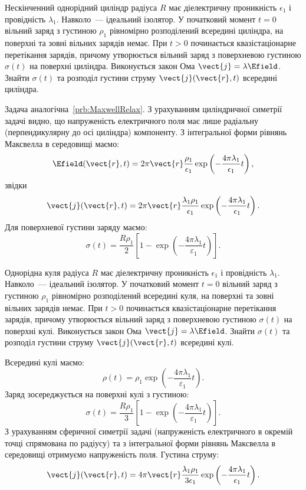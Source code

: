 \begin{problem}
Нескінченний однорідний циліндр радіуса $R$ має діелектричну проникність $\epsilon_1$  і провідність $\lambda_1$. Навколо~--- ідеальний ізолятор. У початковий момент $t = 0$ вільний заряд з густиною $\rho_1$ рівномірно розподілений всередині циліндра, на поверхні та зовні вільних зарядів немає. При $t > 0$  починається квазістаціонарне перетікання зарядів, причому утворюється вільний заряд з поверхневою густиною $\sigma(t)$  на поверхні циліндра. Виконується закон Ома   $\vect{j} = \lambda\Efield$. Знайти  $\sigma(t)$ та розподіл густини струму $\vect{j}(\vect{r},t)$  всередині циліндра.
\begin{solution}
	Задача аналогічна~\ref{prb:MaxwellRelax}. З урахуванням циліндричної симетрії задачі видно, що напруженість електричного поля має лише радіальну (перпендикулярну до осі циліндра) компоненту. З інтегральної форми рівнянь Максвелла в середовищі маємо:
	\[
		\Efield({\vect{r}},t) = 2\pi {\vect{r}}\frac{{{\rho _1}}}{{{\epsilon _1}}}\exp \left( { - \frac{{4\pi {\lambda _1}}}{{{\epsilon_1}}}t} \right),
	\]
	звідки
	\[
		\vect{j}(\vect{r},t) = 2\pi \vect{r}\frac{{{\lambda_1}{\rho_1}}}{{{\epsilon_1}}}\exp \left( { - \frac{{4\pi {\lambda _1}}}{{{\epsilon _1}}}t} \right).
	\]
	Для поверхневої густини заряду маємо:
	\[
		\sigma (t) = \frac{{R{\rho _1}}}{2}\left[ {1 - \exp \left( { - \frac{{4\pi {\lambda _1}}}{{{\varepsilon _1}}}t} \right)} \right].
	\]
\end{solution}
\end{problem}

\begin{problem}
Однорідна куля радіуса $R$ має діелектричну проникність $\epsilon_1$  і провідність $\lambda_1$. Навколо~--- ідеальний ізолятор. У початковий момент $t = 0$ вільний заряд з густиною $\rho_1$ рівномірно розподілений всередині куля, на поверхні та зовні вільних зарядів немає. При $t > 0$  починається квазістаціонарне перетікання зарядів, причому утворюється вільний заряд з поверхневою густиною $\sigma(t)$  на поверхні кулі. Виконується закон Ома   $\vect{j} = \lambda\Efield$. Знайти  $\sigma(t)$ та розподіл густини струму $\vect{j}(\vect{r},t)$  всередині кулі.
\begin{solution}
	Всередині кулі маємо:
	\[
		\rho (t) = {\rho _1}\exp \left( { - \frac{{4\pi {\lambda_1}}}{{{\varepsilon _1}}}t} \right).
	\]
	Заряд зосереджується на поверхні кулі з густиною:
	\[
		\sigma (t) = \frac{{R{\rho _1}}}{3}\left[ {1 - \exp \left( { - \frac{{4\pi {\lambda _1}}}{{{\varepsilon _1}}}t} \right)} \right].
	\]
	З урахуванням сферичної симетрії задачі (напруженість електричного в окремій точці спрямована по радіусу) та з інтегральної форми рівнянь Максвелла в середовищі отримуємо напруженість поля. Густина струму:
	\[
		\vect{j}(\vect{r},t) = 4\pi \vect{r}\frac{{{\lambda_1}{\rho _1}}}{{3{\epsilon _1}}}\exp \left( { - \frac{{4\pi {\lambda_1}}}{{{\epsilon _1}}}t} \right).
	\]
\end{solution}
\end{problem}


